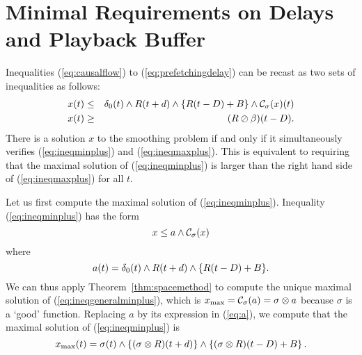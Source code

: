\section{Minimal Requirements on Delays and Playback Buffer}

Inequalities (\ref{eq:causalflow}) to (\ref{eq:prefetchingdelay}) can be recast as two sets of inequalities as follows:
\begin{eqnarray}
\mylabel{eq:ineqminplus}
x(t) & \leq & \delta_0 (t) \wedge R(t+d)  \wedge \{R(t-D) + B \} \wedge \calC_{\sigma} (x)(t)  \\
\mylabel{eq:ineqmaxplus}
x(t) & \geq & (R \oslash \beta)(t-D).
\end{eqnarray}
There is a solution $x$ to the smoothing problem if and only if it simultaneously
verifies (\ref{eq:ineqminplus}) and (\ref{eq:ineqmaxplus}). This is equivalent to requiring
that the maximal solution of (\ref{eq:ineqminplus}) is larger than the right hand side
of (\ref{eq:ineqmaxplus}) for all $t$. %

Let us first compute the maximal solution of  (\ref{eq:ineqminplus}).
Inequality (\ref{eq:ineqminplus}) has the form
\begin{equation}
\mylabel{eq:ineqgeneralminplus}
x \leq a \wedge \calC_{\sigma}(x)
\end{equation}
where
\begin{equation}
\mylabel{eq:a}
a(t) = \delta_0 (t) \wedge R(t+d)  \wedge \{ R(t-D) + B \}.
\end{equation}
We can thus apply Theorem~\ref{thm:spacemethod} to compute the unique maximal solution of (\ref{eq:ineqgeneralminplus}), which is
$x_{\max} = \mathcal C_{\sigma}(a) = \sigma \otimes a$ because $\sigma$ is a `good' function. Replacing $a$ by its expression in (\ref{eq:a}), we compute that the maximal solution
of  (\ref{eq:ineqminplus}) is
\begin{equation}
\mylabel{eq:maxsolution}
x_{\max}(t) = \sigma (t) \wedge \left\{ (\sigma \otimes R)(t+d) \right\} \wedge \left\{ (\sigma \otimes R)(t-D) + B \right\}.
\end{equation}


